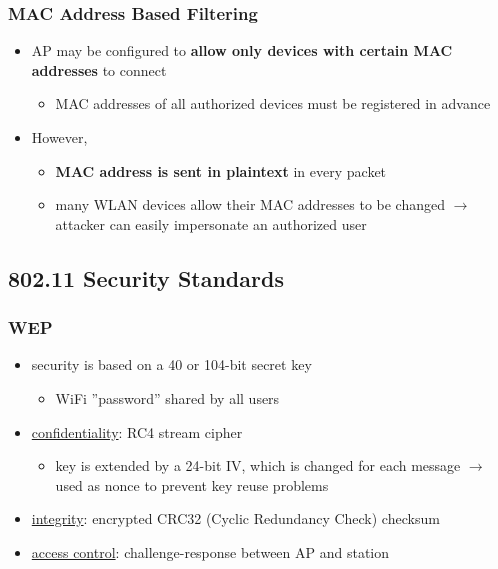 \documentclass[final]{article}
\begin{document}
\subsubsection*{MAC Address Based Filtering}
\begin{itemize}[nosep]
    \item AP may be configured to \textbf{allow only devices with certain MAC addresses} to connect
          \begin{itemize}[nosep]
              \item MAC addresses of all authorized devices must be registered in advance
          \end{itemize}
    \item However,
          \begin{itemize}[nosep]
              \item \textbf{MAC address is sent in plaintext} in every packet
              \item many WLAN devices allow their MAC addresses to be changed $\rightarrow$ attacker can easily impersonate an authorized user
          \end{itemize}
\end{itemize}
\subsection{802.11 Security Standards}
\subsubsection*{WEP}
\begin{itemize}
    \item security is based on a 40 or 104-bit secret key
          \begin{itemize}[nosep]
              \item WiFi ''password'' shared by all users
          \end{itemize}
    \item \underline{confidentiality}: RC4 stream cipher
          \begin{itemize}[nosep]
              \item key is extended by a 24-bit IV, which is changed for each message $\rightarrow$ used as nonce to prevent key reuse problems
          \end{itemize}
    \item \underline{integrity}: encrypted CRC32 (Cyclic Redundancy Check) checksum
    \item \underline{access control}: challenge-response between AP and station
\end{itemize}
\end{document}
